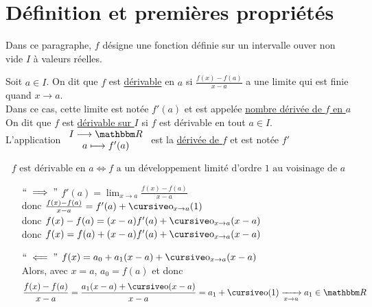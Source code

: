 \part{Définition et premières propriétés}

Dans ce paragraphe, $f$ désigne une fonction définie sur un intervalle ouver non vide $I$ à valeurs réelles.
\vspace{5mm}

\begin{defn}
	Soit $a \in I$. On dit que $f$ est \underline{dérivable} en $a$ si $\frac{f(x)-f(a)}{x-a}$ a une limite qui est finie quand $x \to a$.\\
	Dans ce cas, cette limite est notée $f'(a)$ et est appelée \underline{nombre dérivée de $f$ en $a$}\\
	On dit que $f$ est \underline{dérivable sur $I$} si $f$ est dérivable en tout $a \in I$.\\
	L'application $\begin{array}{c}
		I \longrightarrow \R\\
		a \longmapsto f'(a)
	\end{array}$ est la \underline{dérivée de $f$} et est notée $f'$
\end{defn}

\begin{prop}
	\begin{align*}
		f  \text{ est dérivable en } a \iff f \text{ a un développement limité d'ordre 1 au voisinage de } a
	\end{align*}
\end{prop}

\begin{prv}
	\begin{itemize}
		\item[$``\implies"$] $f'(a) = \lim_{x\to a} \frac{f(x) - f(a)}{x-a}$\\
			donc $\frac{f(x) - f(a)}{x-a} = f'(a) + \po_{x \to a}(1)$\\
			donc $f(x) - f(a) = (x-a)f'(a) + \po_{x \to a}(x-a)$\\
			donc $f(x) = f(a) + (x-a)f'(a) + \po_{x\to a}(x-a)$
		\item [$``\impliedby"$]
			$f(x) = a_0 + a_1(x-a) + \po_{x\to a}(x-a)$ \\
			Alors, avec  $x = a$, $a_0 = f(a)$ et donc \[
				\frac{f(x) - f(a)}{x-a} = \frac{a_1(x-a) + \po(x-a)}{x-a} = a_1 + \po(1) \tendsto{x\to a} a_1 \in \R
			\] 
	\end{itemize}
\end{prv}

